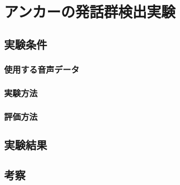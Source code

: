 
\chapter{アンカーの発話群検出実験}
\section{実験条件}
\subsection{使用する音声データ}
\subsection{実験方法}
\subsection{評価方法}
\section{実験結果}
\section{考察}
